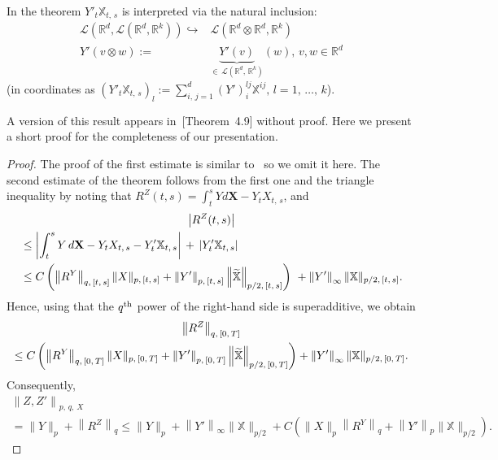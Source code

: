 \documentclass[10pt]{amsart}
\theoremstyle{definition}\newtheorem{defi}[theo]{Definition}\newtheorem{rema}[theo]{Remark}\newtheorem{exam}[theo]{Example}\newtheorem{exem}[theo]{Example}\newtheorem{nota}[theo]{Notation}
\newcommand{\bfX}{\mathbf{X}}
\newcommand{\bbX}{\mathbb{X}}
\newcommand{\calL}{\mathcal{L}}
\newcommand{\Rr}{{\mathbb{R}}}
\let\oldtilde\tilde
\renewcommand*{\tilde}[1]{\mathchoice{\widetilde{#1}}{\widetilde{#1}}{\oldtilde{#1}}{\oldtilde{#1}}}
\begin{document}
In the theorem $Y'_t\bbX_{t,\,s}$ is interpreted via the natural inclusion:
\begin{align*}
\calL\left(\Rr^d,\calL\left(\Rr^d,\Rr^k\right)\right) \hookrightarrow& \calL\left(\Rr^d\otimes\Rr^d,\Rr^k\right)\\
Y'(v\otimes w) :=& \underbrace{Y'(v)}_{\in\,\calL\left(\Rr^d,\,\Rr^k\right)} (w),\, v, w \in \Rr^d
\end{align*}
(in coordinates as $(Y'_t\bbX_{t,\,s})_l:=\sum_{i,\,j=1}^d (Y')^{l j}_i\bbX^{i j},\, l=1,\,\ldots,\,k$).

A version of this result appears in~\cite{perkowski2015b}[Theorem~4.9] without proof. Here we present a short proof for the completeness of our presentation.
\vspace{6pt}
\pagebreak
\begin{proof}
The proof of the first estimate is similar to~\cite[Theorem~31]{FritzShekhar} so we omit it here. The second estimate of the theorem follows from the first one and the triangle inequality by noting that ${R^Z(t,s)}=\int_t^s Yd\bfX-Y_tX_{t,\,s}$, and
\begin{multline}\label{eq:RZ}
\left|R^Z(t,s)\right|\\
\begin{aligned}
&\leq \left|\int_t^s Y\, d\bfX-Y_tX_{t,\,s}-Y'_t\bbX_{t,\,s}\right|\,+\,\left|Y'_t\bbX_{t,\,s}\right|\\
&\leq C\left(\left\|{R}^Y\right\|_{q,\,[t,\,s]}\|X\|_{p,\,[t,\,s]}+\left\|Y'\right\|_{p,\,[t,\,s]}\left\|\tilde{\bbX}\right\|_{p/2,\,[t,\,s]}\right)\ +\left\|Y'\right\|_{\infty}\|\bbX\|_{p/2,\,[t,\,s]}.
\end{aligned}
\end{multline}
Hence, using that the $q^{\rm th}$ power of the right-hand side is superadditive, we obtain
\begin{multline*}
\left\|R^Z\right\|_{q,\,[0,\,T]}\\
\leq C \left(\left\|{R}^Y\right\|_{q,\,[0,\,T]}\|X\|_{p,\,[0,\,T]}+\left\|Y'\right\|_{p,\,[0,\,T]}\left\|\tilde{\bbX}\right\|_{p/2,\,[0,\,T]}\right) +\left\|Y'\right\|_{\infty}\|\bbX\|_{p/2,\,[0,\,T]}.
\end{multline*}
Consequently,
\begin{multline*}
\left\|Z,Z'\right\|_{p,\,q,\,X}\\
=\|Y\|_{p}+\left\|R^Z\right\|_{q}
\leq \|Y\|_{p}+\left\|Y'\right\|_{\infty}\|\bbX\|_{p/2}
+C\left(\|X\|_{p}\left\|R^{Y}\right\|_{q}+\left\|Y'\right\|_{p}\|\bbX\|_{p/2}\right).
\end{multline*}
\end{proof}
\end{document}
